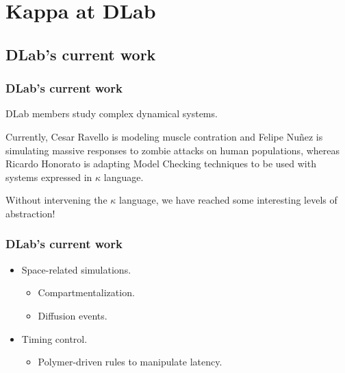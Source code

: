 \documentclass[xcolor=dvipsnames]{beamer}
\begin{document}
\section{Kappa at DLab}
\subsection{DLab's current work}
\begin{frame}
  \frametitle{DLab's current work}
  \begin{flushleft}
    DLab members study complex dynamical systems.
    \newline \pause
    \item Currently, Cesar Ravello is modeling muscle contration and Felipe Nuñez is simulating massive responses to zombie attacks on human populations, whereas Ricardo Honorato is adapting Model Checking techniques to be used with systems expressed in $\kappa$ language.
    \newline \pause
    \item Without intervening the $\kappa$ language, we have reached some interesting levels of abstraction!
  \end{flushleft}
\end{frame}

\begin{frame}
  \frametitle{DLab's current work}
  \begin{itemize}
    \item Space-related simulations.
    \begin{itemize}
      \item Compartmentalization.
      \pause
      \item Diffusion events.
      \newline
    \end{itemize}
    \pause
    \item Timing control.
    \begin{itemize}
      \item Polymer-driven rules to manipulate latency.
    \end{itemize}
  \end{itemize}
\end{frame}
\end{document}
